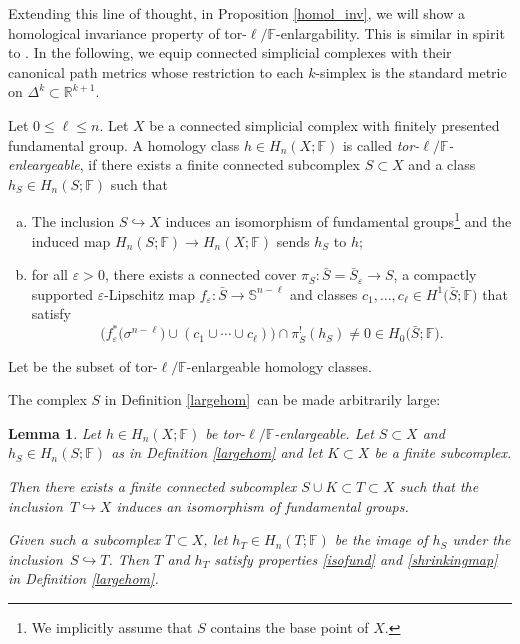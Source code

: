 \documentclass[10pt,a4paper]{amsart}
\numberwithin{equation}{section}
\newtheorem{Lemma}[Theorem]{Lemma}
\newcommand{\F}{\mathbb{F}}
\newcommand{\R}{\mathbb{R}}
\newcommand{\SSS}{\mathbb{S}}
\newcommand{\eps}{\varepsilon}
\begin{document}
Extending this line of thought, in Proposition \ref{homol_inv}, we will show a homological invariance property of tor-$\ell / \F$-enlargability.
This is similar in spirit to \cite[Section 3]{BH10}.
In the following, we equip connected simplicial complexes with their canonical path metrics whose restriction to each $k$-simplex is the standard metric on $\Delta^k \subset \R^{k+1}$.

\begin{Definition} \label{largehom}
Let $0 \leq \ell \leq n$.
Let $X$ be a connected simplicial complex with finitely presented fundamental group.
A homology class $h \in H_n(X; \F)$ is called {\em tor-$\ell / \F$-enleargeable}, if there exists a finite connected subcomplex $S \subset X$ and a class $h_S \in H_n(S; \F)$ such that
\begin{enumerate}[(a)]\itemsep=0pt
\item \label{isofund} The inclusion $S \hookrightarrow X$ induces an isomorphism of fundamental groups\footnote{We implicitly assume that $S$ contains the base point of $X$.} and the induced map $H_n(S ; \F) \to H_n(X; \F)$ sends $h_S$ to $h$;
\item \label{shrinkingmap} for all $\eps > 0$, there exists a connected cover $\pi_S \colon \bar S = \bar S_\eps \to S$, a compactly supported $\eps$-Lipschitz map $f_\eps \colon \bar S \to \SSS^{n-\ell}$ and classes $c_1 , \ldots, c_\ell \in H^1\big(\bar S; \F\big)$ that satisfy
 \begin{equation*}
 \big( f_\eps^*\big(\sigma^{n-\ell}\big) \cup (c_1 \cup \cdots \cup c_\ell) \big) \cap \pi_S^!(h_S) \neq 0 \in H_{0}\big(\bar S; \F\big) .
\end{equation*}
\end{enumerate}
Let
\smash{$
 H_*^{\text{\rm tor-}\ell/\F\text{\rm-enl}}(X; \F) \subset H_*(X ; \F)
$}
be the subset of tor-$\ell/\F$-enlargeable homology classes.
\end{Definition}

The complex $S$ in Definition \ref{largehom} can be made arbitrarily large:

\begin{Lemma} \label{subcomplexinv} Let $h\in H_n(X; \F)$ be tor-$\ell / \F$-enlargeable.
Let $S \subset X$ and $h_S \in H_n(S;\F)$ as in Definition {\rm\ref{largehom}} and let $K \subset X$ be a finite subcomplex.

Then there exists a finite connected subcomplex $S \cup K \subset T \subset X$ such that the inclusion~${T \hookrightarrow X}$ induces an isomorphism of fundamental groups.

Given such a subcomplex $T \subset X$, let $h_T \in H_n(T; \F)$ be the image of $h_S$ under the inclusion~${S \hookrightarrow T}$.
Then $T$ and $h_T$ satisfy properties {\rm\ref{isofund}} and {\rm\ref{shrinkingmap}} in Definition {\rm\ref{largehom}}.
\end{Lemma}
\end{document}
